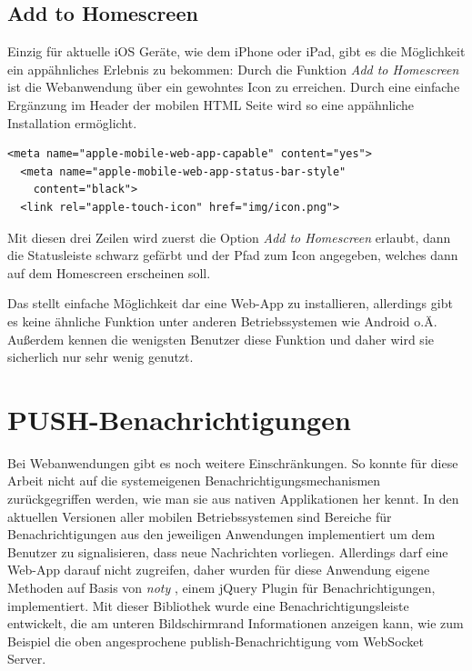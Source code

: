 \subsection{Add to Homescreen}
Einzig für aktuelle iOS Geräte, wie dem iPhone oder iPad, gibt es die Möglichkeit ein appähnliches Erlebnis zu bekommen: Durch die Funktion \emph{Add to Homescreen} ist die Webanwendung über ein gewohntes Icon zu erreichen. Durch eine einfache Ergänzung im Header der mobilen HTML Seite wird so eine appähnliche Installation ermöglicht.
\\
\begin{lstlisting}[captionpos=b, caption=Ergänzung im Header der mobilen Seite]
  <meta name="apple-mobile-web-app-capable" content="yes">
  <meta name="apple-mobile-web-app-status-bar-style"
  	content="black">
  <link rel="apple-touch-icon" href="img/icon.png">
\end{lstlisting}
Mit diesen drei Zeilen wird zuerst die Option \emph{Add to Homescreen} erlaubt, dann die Statusleiste schwarz gefärbt und der Pfad zum Icon angegeben, welches dann auf dem Homescreen erscheinen soll.\par

Das stellt einfache Möglichkeit dar eine Web-App zu installieren, allerdings gibt es keine ähnliche Funktion unter anderen Betriebssystemen wie Android o.Ä. Außerdem kennen die wenigsten Benutzer diese Funktion und daher wird sie sicherlich nur sehr wenig genutzt.


\section{PUSH-Benachrichtigungen}
Bei Webanwendungen gibt es noch weitere Einschränkungen. So konnte für diese Arbeit nicht auf die systemeigenen Benachrichtigungsmechanismen zurückgegriffen werden, wie man sie aus nativen Applikationen her kennt. In den aktuellen Versionen aller mobilen Betriebssystemen sind Bereiche für Benachrichtigungen aus den jeweiligen Anwendungen implementiert um dem Benutzer zu signalisieren, dass neue Nachrichten vorliegen. Allerdings darf eine Web-App darauf nicht zugreifen, daher wurden für diese Anwendung eigene Methoden auf Basis von \emph{noty} \cite{noty}, einem jQuery Plugin für Benachrichtigungen, implementiert. Mit dieser Bibliothek wurde eine Benachrichtigungsleiste entwickelt, die am unteren Bildschirmrand Informationen anzeigen kann, wie zum Beispiel die oben angesprochene publish-Benachrichtigung vom WebSocket Server.\par

